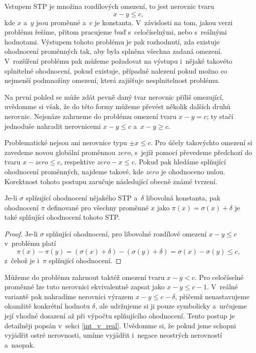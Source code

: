 Vstupem STP je množina rozdílových omezení, to jest nerovnic tvaru $$x - y \leq c,$$ kde $x$ a~$y$ jsou proměnné a~$c$ je konstanta. V~závislosti na tom, jakou verzi problému řešíme, přitom pracujeme buď s~celočíselnými, nebo s~reálnými hodnotami. Výstupem tohoto problému je pak rozhodnutí, zda existuje ohodnocení proměnných tak, aby byla splněna všechna zadaná omezení. V~rozšíření problému pak můžeme požadovat na výstupu i~nějaké takovéto splnitelné ohodnocení, pokud existuje, případně nalezení pokud možno co nejmenší podmnožiny omezení, která zajišťuje nesplnitelnost problému.

Na první pohled se může zdát pevně daný tvar nerovnic příliš omezující, uvědomme si však, že do této formy můžeme převést několik dalších druhů nerovnic. Nejsnáze zahrneme do problému omezení tvaru $x - y = c$; ty stačí jednoduše nahradit nerovnicemi $x - y \leq c$ a~$x - y \geq c$.

Problematické nejsou ani nerovnice typu $\pm x \leq c$. Pro účely takovýchto omezení si zavedeme novou globální proměnnou $zero$, s~jejíž pomocí převedeme předchozí do tvaru $x - zero \leq c$, respektive $zero - x \leq c$. Pokud pak hledáme splňující ohodnocení proměnných, najdeme takové, kde $zero$ je ohodnoceno nulou. Korektnost tohoto postupu zaručuje následující obecně známé tvrzení.

\begin{tvrz}
	Je-li $\sigma$ splňující ohodnocení nějakého STP a~$\delta$ libovolná konstanta, pak ohodnocení $\pi$ definované pro všechny proměnné $x$ jako $\pi(x) = \sigma(x) + \delta$ je také splňující ohodnocení tohoto STP.
\end{tvrz}
\begin{proof}
	Je-li $\sigma$ splňující ohodnocení, pro libovolné rozdílové omezení $x-y \leq c$ v~problému platí $$\pi(x) - \pi(y) = (\sigma(x) + \delta) - (\sigma(y) + \delta) = \sigma(x) - \sigma(y) \leq c,$$ z~čehož je i~$\pi$ splňující ohodnocení.
\end{proof}

Můžeme do problému zahrnout taktéž omezení tvaru $x - y < c$. Pro celočíselné proměnné lze tuto nerovnici ekvivalentně zapsat jako $x - y \leq c-1$. V~reálné variantě pak nahradíme nerovnici výrazem $x - y \leq c - \delta$, přičemž nenastavujeme okamžitě konkrétní hodnotu $\delta$, ale udržujeme si ji pouze symbolicky a~určujeme její vhodné dosazení až při výpočtu splňujícího ohodnocení. Tento postup je detailněji popsán v~sekci \ref{int_v_real}. Uvědomme si, že pokud jsme schopni vyjádřit ostré nerovnosti, umíme vyjádřit i~negace neostrých nerovností a~naopak.

